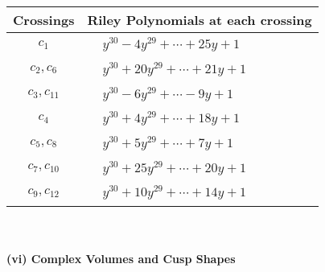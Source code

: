 \documentclass[1p]{elsarticle_modified}
\theoremstyle{definition}
\begin{document}
\begin{tabular}{m{50pt}|m{274pt}}
Crossings & \hspace{64pt}Riley Polynomials at each crossing \\
\hline $$\begin{aligned}c_{1}\end{aligned}$$&$\begin{aligned}
&y^{30}-4 y^{29}+\cdots+25 y+1
\end{aligned}$\\
\hline $$\begin{aligned}c_{2},c_{6}\end{aligned}$$&$\begin{aligned}
&y^{30}+20 y^{29}+\cdots+21 y+1
\end{aligned}$\\
\hline $$\begin{aligned}c_{3},c_{11}\end{aligned}$$&$\begin{aligned}
&y^{30}-6 y^{29}+\cdots-9 y+1
\end{aligned}$\\
\hline $$\begin{aligned}c_{4}\end{aligned}$$&$\begin{aligned}
&y^{30}+4 y^{29}+\cdots+18 y+1
\end{aligned}$\\
\hline $$\begin{aligned}c_{5},c_{8}\end{aligned}$$&$\begin{aligned}
&y^{30}+5 y^{29}+\cdots+7 y+1
\end{aligned}$\\
\hline $$\begin{aligned}c_{7},c_{10}\end{aligned}$$&$\begin{aligned}
&y^{30}+25 y^{29}+\cdots+20 y+1
\end{aligned}$\\
\hline $$\begin{aligned}c_{9},c_{12}\end{aligned}$$&$\begin{aligned}
&y^{30}+10 y^{29}+\cdots+14 y+1
\end{aligned}$\\
\hline
\end{tabular}\\~\\
\newpage\flushleft \textbf{(vi) Complex Volumes and Cusp Shapes}
\end{document}
